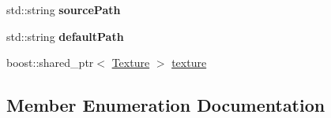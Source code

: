 \begin{DoxyCompactItemize}
\item 
std\+::string {\bfseries source\+Path}\hypertarget{structTechnique_1_1Pass_1_1TextureUnit_a6f170136862527ba7a37daf7db07ab2d}{}\label{structTechnique_1_1Pass_1_1TextureUnit_a6f170136862527ba7a37daf7db07ab2d}

\item 
std\+::string {\bfseries default\+Path}\hypertarget{structTechnique_1_1Pass_1_1TextureUnit_a06429cb14ce6f732aae4f7dbf1a9e5d1}{}\label{structTechnique_1_1Pass_1_1TextureUnit_a06429cb14ce6f732aae4f7dbf1a9e5d1}

\item 
boost\+::shared\+\_\+ptr$<$ \hyperlink{classTexture}{Texture} $>$ \hyperlink{structTechnique_1_1Pass_1_1TextureUnit_a0b49e23c5d11320ca2bda98909c2259d}{texture}
\end{DoxyCompactItemize}


\subsection{Member Enumeration Documentation}
